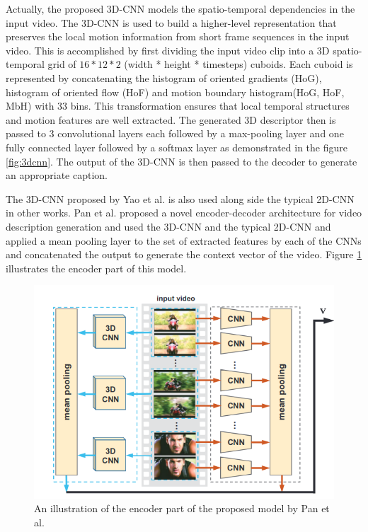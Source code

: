 \documentclass[preprint, 12pt]{elsarticle}
\begin{document}
		Actually, the proposed 3D-CNN models the spatio-temporal dependencies in the input video. The 3D-CNN is used to build a higher-level representation that preserves the local motion information from short frame sequences in the input video. This is accomplished by first dividing the input video clip into a 3D spatio-temporal grid of $16 * 12 * 2$ (width * height * timesteps) cuboids. Each cuboid is represented by concatenating the histogram of oriented gradients (HoG), histogram of oriented flow (HoF) and motion boundary histogram(HoG, HoF, MbH) with 33 bins. This transformation ensures that local temporal structures and motion features are well extracted. The generated 3D descriptor then is passed to 3 convolutional layers each followed by a max-pooling layer and one fully connected layer followed by a softmax layer as demonstrated in the figure \ref{fig:3dcnn}. The output of the 3D-CNN is then passed to the decoder to generate an appropriate caption.
		
		The 3D-CNN proposed by Yao et al. \cite{yao2015describing} is also used along side the typical 2D-CNN in other works. Pan et al. \cite{pan2016jointly} proposed a novel encoder-decoder architecture for video description generation and used the 3D-CNN and the typical 2D-CNN and applied a mean pooling layer to the set of extracted features by each of the CNNs and concatenated the output to generate the context vector of the video. Figure \ref{fig:3dcnn2} illustrates the encoder part of this model.
		
		\begin{figure}[H]
			\centering
			\includegraphics[scale=0.5]{Imgs/3DCNN2.png}
			\caption{An illustration of the encoder part of the proposed model by Pan et al. \cite{pan2016jointly}}
			\label{fig:3dcnn2}
		\end{figure}
\end{document}

